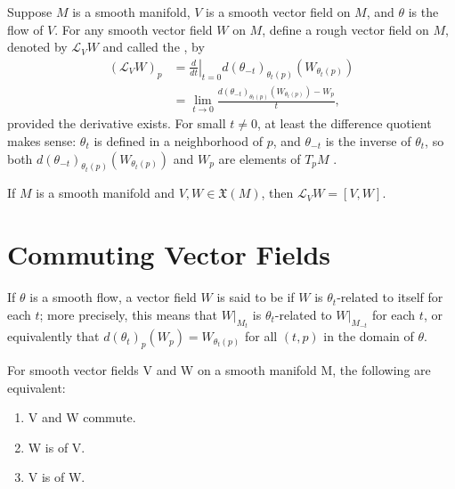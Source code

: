 \documentclass[../main.tex]{subfiles}
\begin{document}
\begin{definition}{}{}
Suppose $M$ is a smooth manifold, $V$ is a smooth vector field on $M$, and $\theta$ is the flow of $V$. For any smooth vector field $W$ on $M$, define a rough vector field on $M$, denoted by $\mathcal{L}_V W$ and called the , by
\begin{equation}
\begin{aligned}
(\mathcal{L}_V W)_p &= \left. \frac{d}{dt} \right|_{t=0} d(\theta_{-t})_{\theta_t(p)}(W_{\theta_t(p)}) \\
&= \lim_{t \to 0} \frac{d(\theta_{-t})_{\theta_t(p)}(W_{\theta_t(p)}) - W_p}{t},
\end{aligned}
\end{equation}
provided the derivative exists. For small $t \neq 0$, at least the difference quotient makes sense: $\theta_t$ is defined in a neighborhood of $p$, and $\theta_{-t}$ is the inverse of $\theta_t$, so both $d(\theta_{-t})_{\theta_t(p)}(W_{\theta_t(p)})$ and $W_p$ are elements of $T_p M$ .
\end{definition}

\begin{theorem}{}{}
If $M$ is a smooth manifold and $V, W \in \mathfrak{X}(M)$, then $\mathcal{L}_V W = [V, W]$.
\end{theorem}

\section{Commuting Vector Fields}


\begin{definition}{}{}
    If $\theta$ is a smooth flow, a vector field $W$ is said to be  if $W$ is $\theta_t$-related to itself for each $t$; more precisely, this means that $W|_{M_t}$ is $\theta_t$-related to $W|_{M_{-t}}$ for each $t$, or equivalently that $d(\theta_t)_p(W_p) = W_{\theta_t(p)}$ for all $(t, p)$ in the domain of $\theta$.
\end{definition}

\begin{theorem}{}{}
For smooth vector fields V and W on a smooth manifold M, the following are equivalent:
\begin{enumerate}
\item[(a)] V and W commute.
\item[(b)] W is  of V.
\item[(c)] V is  of W.
\end{enumerate}
\end{theorem}
\end{document}
